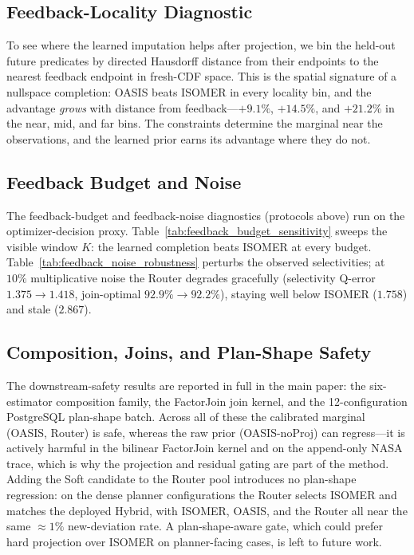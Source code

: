 \documentclass[11pt]{article}
\begin{document}
\subsection{Feedback-Locality Diagnostic}

To see where the learned imputation helps after projection, we bin the
held-out future predicates by directed Hausdorff distance from their endpoints to
the nearest feedback endpoint in fresh-CDF space. This is the spatial signature of a
nullspace completion: OASIS beats ISOMER in every locality bin, and the advantage
\emph{grows} with distance from feedback---$+9.1\%$, $+14.5\%$, and $+21.2\%$ in the
near, mid, and far bins. The constraints determine the marginal near the observations,
and the learned prior earns its advantage where they do not.



\subsection{Feedback Budget and Noise}

The feedback-budget and feedback-noise diagnostics (protocols above) run on the
optimizer-decision proxy. Table~\ref{tab:feedback_budget_sensitivity} sweeps the visible
window $K$: the learned completion beats ISOMER at every budget.
Table~\ref{tab:feedback_noise_robustness} perturbs the observed selectivities; at $10\%$
multiplicative noise the Router degrades gracefully (selectivity Q-error $1.375\to1.418$,
join-optimal $92.9\%\to92.2\%$), staying well below ISOMER ($1.758$) and stale ($2.867$).





\subsection{Composition, Joins, and Plan-Shape Safety}

The downstream-safety results are reported in full in the main paper: the six-estimator
composition family, the FactorJoin join kernel, and the 12-configuration PostgreSQL
plan-shape batch. Across all of these the calibrated marginal (OASIS, Router) is safe,
whereas the raw prior (OASIS-noProj) can regress---it is actively harmful in the bilinear
FactorJoin kernel and on the append-only NASA trace, which is why the projection and
residual gating are part of the method. Adding the Soft candidate to the Router pool
introduces no plan-shape regression: on the dense planner configurations the Router selects
ISOMER and matches the deployed Hybrid, with ISOMER, OASIS, and the Router all near the
same $\approx 1\%$ new-deviation rate. A plan-shape-aware gate, which could prefer hard
projection over ISOMER on planner-facing cases, is left to future work.
\end{document}
